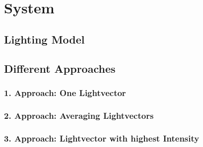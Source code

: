 \section{System}\label{sec:System}

\subsection{Lighting Model}\label{sec:lightingmodel}

\subsection{Different Approaches}\label{sec:approaches}

\subsubsection{1. Approach: One Lightvector}\label{sec:appOne}

\subsubsection{2. Approach: Averaging Lightvectors}\label{sec:appTwo}

\subsubsection{3. Approach: Lightvector with highest Intensity}\label{sec:appThree}


\newpage
